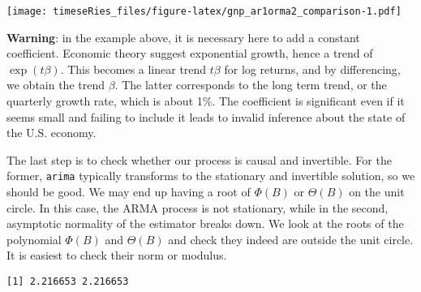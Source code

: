 \documentclass[]{book}
\newenvironment{Shaded}{\begin{snugshade}}{\end{snugshade}}
\newcommand{\KeywordTok}[1]{\textcolor[rgb]{0.13,0.29,0.53}{\textbf{#1}}}
\newcommand{\DecValTok}[1]{\textcolor[rgb]{0.00,0.00,0.81}{#1}}
\newcommand{\CommentTok}[1]{\textcolor[rgb]{0.56,0.35,0.01}{\textit{#1}}}
\newcommand{\OperatorTok}[1]{\textcolor[rgb]{0.81,0.36,0.00}{\textbf{#1}}}
\newcommand{\NormalTok}[1]{#1}
\begin{document}
\texttt{[image: timeseRies\_files/figure-latex/gnp\_ar1orma2\_comparison-1.pdf]}

\textbf{Warning}: in the example above, it is necessary here to add a
constant coefficient. Economic theory suggest exponential growth, hence
a trend of \(\exp(t \beta)\). This becomes a linear trend \(t\beta\) for
log returns, and by differencing, we obtain the trend \(\beta\). The
latter corresponds to the long term trend, or the quarterly growth rate,
which is about 1\%. The coefficient is significant even if it seems
small and failing to include it leads to invalid inference about the
state of the U.S. economy.

The last step is to check whether our process is causal and invertible.
For the former, \texttt{arima} typically transforms to the stationary
and invertible solution, so we should be good. We may end up having a
root of \(\Phi(B)\) or \(\Theta(B)\) on the unit circle. In this case,
the ARMA process is not stationary, while in the second, asymptotic
normality of the estimator breaks down. We look at the roots of the
polynomial \(\Phi(B)\) and \(\Theta(B)\) and check they indeed are
outside the unit circle. It is easiest to check their norm or modulus.

\begin{Shaded}
\end{Shaded}

\begin{verbatim}
[1] 2.216653 2.216653
\end{verbatim}

\begin{Shaded}
\end{Shaded}
\end{document}
